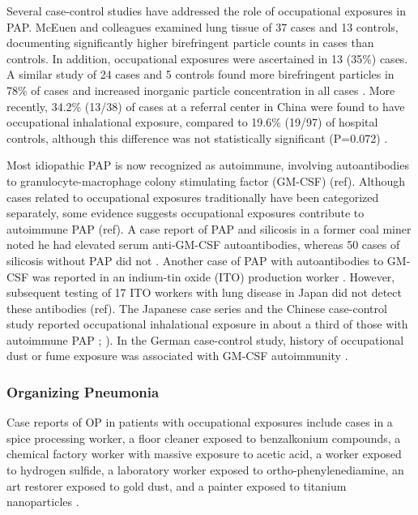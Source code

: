 \documentclass[a4paper,12pt]{article}
\begin{document}
Several case-control studies have addressed the role of occupational exposures in PAP.  McEuen and colleagues \cite{McEuen1978} examined lung tissue of 37 cases and 13 controls, documenting significantly higher birefringent particle counts in cases than controls.  In addition, occupational exposures were ascertained in 13 (35\%) cases.  A similar study of 24 cases and 5 controls found more birefringent particles in 78\% of cases and increased inorganic particle concentration
in all cases \cite{Abraham1986}.  More recently, 34.2\% (13/38) of cases at a referral center in China were found to have occupational inhalational exposure, compared to 19.6\% (19/97) of hospital controls, although this difference was not statistically significant (P=0.072) \cite{Xiao2015}.   

Most idiopathic PAP is now recognized as autoimmune, involving autoantibodies to granulocyte-macrophage colony stimulating factor (GM-CSF) (ref).  Although cases related to occupational exposures traditionally have been categorized separately, some evidence suggests occupational exposures contribute to autoimmune PAP (ref).  A case report of PAP and silicosis in a former coal miner noted he had elevated serum anti-GM-CSF autoantibodies, whereas 50 cases of silicosis without PAP did
not \cite{Hosokawa2004}.  Another case of PAP with autoantibodies to GM-CSF was reported in an indium-tin oxide (ITO) production worker \cite{Cummings2010}.  However, subsequent testing of 17 ITO workers with lung disease in Japan did not detect these antibodies (ref).  The Japanese case series and the Chinese case-control study reported occupational inhalational exposure in about a third of those with autoimmune PAP \cite{Inoue2008}; \cite{Xiao2015}).  In the German case-control study, history of
occupational dust or fume exposure was associated with GM-CSF autoimmunity \cite{Bonella2011}.  

\subsubsection{Organizing Pneumonia}

Case reports of OP in patients with occupational exposures include cases in a spice processing worker, a floor cleaner exposed to benzalkonium compounds, a chemical factory worker with massive exposure to acetic acid, a worker exposed to hydrogen sulfide, a laboratory worker exposed to ortho-phenylenediamine, an art restorer exposed to gold dust, and a painter exposed to titanium nanoparticles \cite{Alleman2002}\cite{Stefano2003}\cite{Sheu2008}\cite{Doujaiji2010}\cite{Sanchez-Ortiz2011}\cite{Ribeiro2011}\cite{Cheng2012}.
\end{document}

